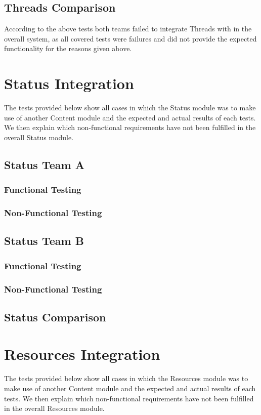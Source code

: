 \documentclass[12pt, oneside]{article}
\begin{document}
	\subsection{Threads Comparison}
	According to the above tests both teams failed to integrate Threads with in the overall system, as all covered tests were failures and did not provide the expected functionality for the reasons given above.
	
\newpage 
\section{Status Integration}
The tests provided below show all cases in which the Status module was to make use of another Content module and the expected and actual results of each tests. We then explain which non-functional requirements have not been fulfilled in the overall Status module.
	\subsection{Status Team A}	
		\subsubsection{Functional Testing}
			
		\subsubsection{Non-Functional Testing }
			
	
	\subsection{Status Team B}	
		\subsubsection{Functional Testing}
			
		\subsubsection{Non-Functional Testing }
			
	
	\subsection{Status Comparison}
\newpage 
\section{Resources Integration}
The tests provided below show all cases in which the Resources module was to make use of another Content module and the expected and actual results of each tests. We then explain which non-functional requirements have not been fulfilled in the overall Resources module.
\end{document}
